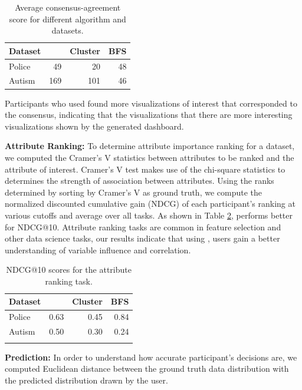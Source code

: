 \begin{table}
	\centering
	\begin{tabular}{lrrr}
	\hline
	 Dataset   &   \system &   Cluster &   BFS \\
	\hline
	 Police    &           49 &        20 &    48 \\
	 Autism    &          169 &       101 &    46 \\
	\hline
	\end{tabular}
	\caption{Average consensus-agreement score for different algorithm and datasets.}
	\label{interesting_score}
\end{table}

Participants who used \system found more visualizations of interest that corresponded to the consensus, indicating that the visualizations that there are more interesting visualizations shown by the generated dashboard.  
\par \textbf{Attribute Ranking:} 
To determine attribute importance ranking for a dataset, we computed the Cramer's V statistics between attributes to be ranked and the attribute of interest. Cramer's V test makes use of the chi-square statistics to determines the strength of association between attributes. Using the ranks determined by sorting by Cramer's V as ground truth, we compute the normalized discounted cumulative gain (NDCG) of each participant's ranking at various cutoffs and average over all tasks. As shown in Table \ref{ndcg_ranking_result}, \system performs better for NDCG@10. Attribute ranking tasks are common in feature selection and other data science tasks, our results indicate that using \system, users gain a better understanding of variable influence and correlation. 
\begin{table}
	\centering
	\begin{tabular}{lrrr}
	\hline
	 Dataset   &   \system &   Cluster &   BFS \\
	\hline
	 Police    &      0.63 &      0.45 &  0.84 \\
	 Autism    &      0.50 &      0.30 &  0.24 \\
	\hline
	\label{ndcg_ranking_result}
	\end{tabular}
	\caption{NDCG@10 scores for the attribute ranking task.}
\end{table}
\par \textbf{Prediction:}
In order to understand how accurate participant's decisions are, we computed Euclidean distance between the ground truth data distribution with the predicted distribution drawn by the user. 

